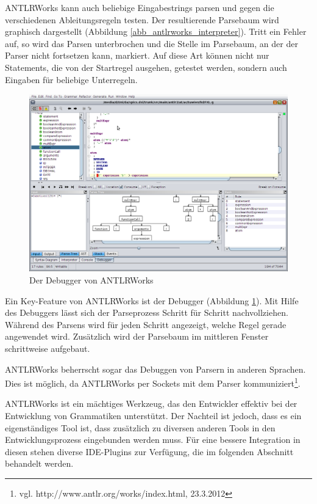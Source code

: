 ANTLRWorks kann auch beliebige Eingabestrings parsen und gegen die verschiedenen Ab\-lei\-tungs\-re\-geln testen. Der resultierende Parsebaum wird graphisch dargestellt (Abbildung \ref{abb_antlrworks_interpreter}). Tritt ein Fehler auf, so wird das Parsen unterbrochen und die Stelle im Parsebaum, an der der Parser nicht fortsetzen kann, markiert. Auf diese Art können nicht nur Statements, die von der Startregel ausgehen, getestet werden, sondern auch Eingaben für beliebige Unterregeln.


\begin{figure}[h]
\includegraphics[scale=0.35]{figures/antlrworks_debugger}
\caption{Der Debugger von ANTLRWorks}
\label{abb_antlrworks_debugger}
\end{figure}

Ein Key-Feature von ANTLRWorks ist der Debugger (Abbildung \ref{abb_antlrworks_debugger}). Mit Hilfe des Debuggers lässt sich der Parseprozess Schritt für Schritt nachvollziehen. Während des Parsens wird für jeden Schritt angezeigt, welche Regel gerade angewendet wird. Zu\-sätz\-lich wird der Parsebaum im mittleren Fenster schrittweise aufgebaut.

ANTLRWorks beherrscht sogar das Debuggen von Parsern in anderen Spra\-chen. Dies ist möglich, da ANTLRWorks per Sockets mit dem Parser kommuniziert\footnote{ vgl. http://www.antlr.org/works/index.html, 23.3.2012}.


ANTLRWorks ist ein mächtiges Werkzeug, das den Entwickler effektiv bei der Entwicklung von Grammatiken unterstützt. Der Nachteil ist jedoch, dass es ein eigenständiges Tool ist, dass zusätzlich zu diversen anderen Tools in den Entwicklungsprozess eingebunden werden muss. Für eine bessere Integration in diesen stehen diverse IDE-Plugins zur Verfügung, die im folgenden Abschnitt behandelt werden.
 
